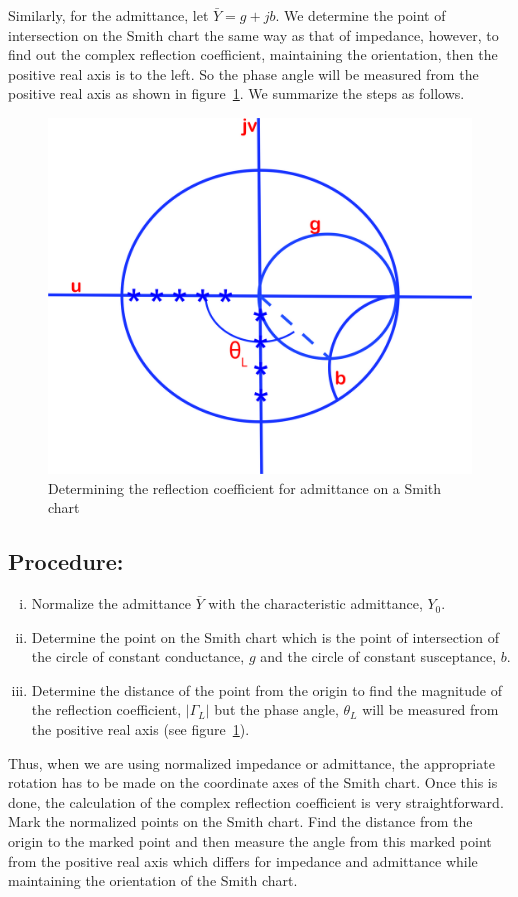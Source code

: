 Similarly, for the admittance, let $\bar{Y} = g + jb$. We determine the point of intersection on the Smith chart the same way as that of impedance, however, to find out the complex reflection coefficient, maintaining the orientation, then the positive real axis is to the left. So the phase angle will be measured from the positive real axis as shown in figure~\ref{fig:kjhgfds}. We summarize the steps as follows.
\begin{figure}[h]
\centering
\includegraphics[width=0.7\linewidth]{./graphics/KJHGFDS}
\caption{Determining the reflection coefficient for admittance on a Smith chart}
\label{fig:kjhgfds}
\end{figure}

\subsection*{Procedure:}
\begin{enumerate}[(i)]
\item Normalize the admittance $\bar{Y}$ with the characteristic admittance, $Y_0$.
\item Determine the point on the Smith chart which is the point of intersection of the circle of constant conductance, $g$ and the circle of constant susceptance, $b$.
\item Determine the distance of the point from the origin to find the magnitude of the reflection coefficient, $|\Gamma_L|$ but the phase angle, $\theta_L$ will be measured from the positive real axis (see figure~\ref{fig:kjhgfds}). 
\end{enumerate}

Thus, when we are using normalized impedance or admittance, the appropriate rotation has to be made on the coordinate axes of the Smith chart. Once this is done, the calculation of the complex reflection coefficient is very straightforward. Mark the normalized points on the Smith chart. Find the distance from the origin to the marked point and then measure the angle from this marked point from the positive real axis which differs for impedance and admittance while maintaining the orientation of the Smith chart. 

